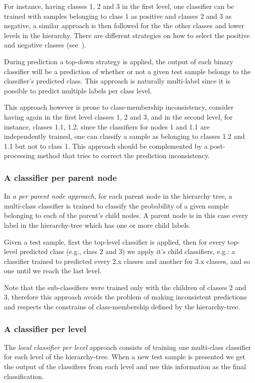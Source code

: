 \documentclass[11pt,a4paper]{article}
\begin{document}
For instance, having classes 1, 2 and 3 in the first level, one classifier can be trained with
samples belonging to class 1 as positive and classes 2 and 3 as negative, a similar approach is then
followed for the the other classes and lower levels in the hierarchy. There are different strategies
on how to select the positive and negative classes (see~\cite{}).

During prediction a top-down strategy is applied, the output of each binary classifier will be a
prediction of whether or not a given test sample belongs to the classifier’s predicted class. This
approach is naturally multi-label since it is possible to predict multiple labels per class level.

This approach however is prone to class-membership inconsistency, consider having again in the first
level classes 1, 2 and 3, and in the second level, for instance, classes 1.1, 1.2, since the
classifiers for nodes 1 and 1.1 are independently trained, one can classify a sample as belonging to
classes 1.2 and 1.1 but not to class 1. This approach should be complemented by
a post-processing method that tries to correct the prediction inconsistency.


\subsubsection{A classifier per parent node} %
In \textit{a per parent node approach}, for each parent node in the hierarchy tree, a multi-class
classifier is trained to classify the probability of a given sample belonging to each of the parent's
child nodes. A parent node is in this case every label in the hierarchy-tree which has one or more
child labels.

Given a test sample, first the top-level classifier is applied, then for every top-level
predicted class (e.g., class 2 and 3) we apply it's child classifiers, e.g.: a classifier
trained to predicted every 2.x classes and another for 3.x classes, and so one until we reach the
last level.

Note that the sub-classifiers were trained only with the children of classes 2 and 3, therefore
this approach avoids the problem of making inconsistent predictions and respects the constrains
of class-membership defined by the hierarchy-tree.


\subsubsection{A classifier per level} %
The \textit{local classifier per level} approach consists of training one multi-class classifier
for each level of the hierarchy-tree. When a new test sample is presented we get the output of the
classifiers from each level and use this information as the final classification.
\end{document}
